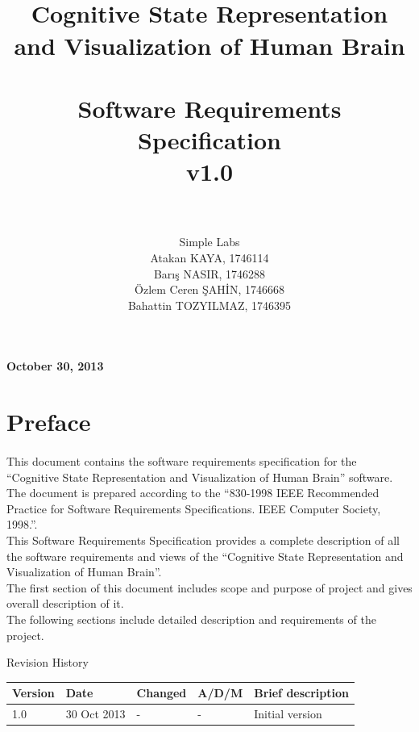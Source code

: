 \documentclass[paper=a4, fontsize=12pt]{scrartcl}	%
\title{
		\vspace{1in} 	
		\usefont{OT1}{bch}{b}{n}
		\horrule{0.5pt} \\[0.4cm]
		\huge Cognitive State Representation and Visualization of Human Brain \\
		\horrule{2pt} \\[0.5cm]
		\Large Software Requirements Specification \\
		\normalfont \normalsize v1.0 \\
		\horrule{0.5pt} \\[0.4cm]
}
\author{
		\normalfont 
		\Large \textsf{Simple Labs}\\[0.5cm] \normalsize
        \hfill Atakan KAYA, 1746114 \\[-3pt]		\normalsize
        \hfill Barış NASIR, 1746288 \\[-3pt]		\normalsize
        \hfill Özlem Ceren ŞAHİN, 1746668 \\[-3pt]		\normalsize
        \hfill Bahattin TOZYILMAZ, 1746395 \\[-3pt]		\normalsize        
}
\date{}
\numberwithin{equation}{section}		%
\numberwithin{figure}{section}			%
\numberwithin{table}{section}				%
\begin{document}
	\bigskip
	\maketitle
	\begin{center}
		\textbf{October 30, 2013}
	\end{center}
	\thispagestyle{empty}
    \newpage
    
\section*{Preface}
	\paragraph{}
    \normalsize
	This document contains the software requirements specification for the “Cognitive State Representation and Visualization of Human Brain” 
software. The document is prepared according to the “830-1998 IEEE Recommended 
Practice for Software Requirements Specifications. IEEE Computer Society, 1998.”. \\

	This Software Requirements Specification provides a complete description of all the software 
requirements and views of the “Cognitive State Representation and Visualization of Human Brain”. \\

	The first section of this document includes scope and purpose of project and gives 
overall description of it. \\

	The following sections include detailed description and requirements of the project. \\

	\newpage
    \begin{center}
    	\Large Revision History \\
    \end{center}
    \normalsize
	\begin{tabular}{|p{1.2cm}|p{2cm}|p{3cm}|p{1.2cm}|p{7cm}|}
    	\hline
        	Version & Date & Changed & A/D/M & Brief description \\
  		\hline
        	1.0 & 30 Oct 2013 & - & - & Initial version \\
  		\hline
	 \end{tabular}

	\newpage{}
	\begin{otherlanguage}{english}
		\tableofcontents
	\end{otherlanguage}
	\newpage
    
\end{document}

